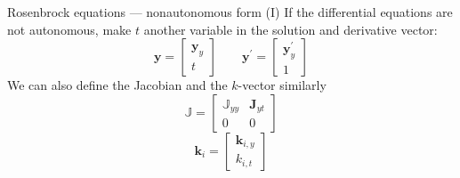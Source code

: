 \documentclass[serif]{beamer}
\begin{document}
\begin{frame}{Rosenbrock equations --- nonautonomous form (I)}
  If the differential equations are not autonomous, make $t$ another variable in the solution and derivative vector:
  \begin{equation}
    \nonumber \mathbf{y} = \left[ \begin{array}{c}
    \mathbf{y}_y \\
    t
    \end{array} \right ] \qquad
    \nonumber \mathbf{y}^\prime = \left[ \begin{array}{c}
    \mathbf{y}_y^\prime \\
    1
    \end{array} \right ]
  \end{equation}
  We can also define the Jacobian and the $k$-vector similarly
  \begin{equation}
    \nonumber \mathbb{J} = \left[ \begin{array}{cc}
    \mathbb{J}_{yy} & \mathbf{J}_{yt} \\
    0 & 0
    \end{array} \right]
  \end{equation}
  \begin{equation}
    \nonumber \mathbf{k}_i = \left[ \begin{array}{c}
    \mathbf{k}_{i,y} \\
    k_{i,t}
    \end{array} \right ]
  \end{equation}
\end{frame}
\end{document}
